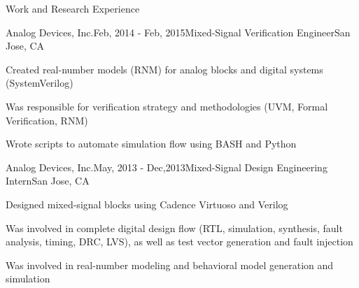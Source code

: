 \begin{rSection} {Work and Research Experience}
\begin{rSubsection}{Analog Devices, Inc.}{Feb, 2014 - Feb, 2015}{Mixed-Signal Verification Engineer}{San Jose, CA}
  \item Created real-number models (RNM) for analog blocks and digital systems (SystemVerilog)
  \item Was responsible for verification strategy and methodologies (UVM, Formal Verification, RNM)
  \item Wrote scripts to automate simulation flow using BASH and Python
  \end{rSubsection}
  \begin{rSubsection}{Analog Devices, Inc.}{May, 2013 - Dec,2013}{Mixed-Signal Design Engineering Intern}{San Jose, CA}
  \item Designed mixed-signal blocks using Cadence Virtuoso and Verilog
  \item Was involved in complete digital design flow (RTL, simulation, synthesis, fault analysis, timing, DRC, LVS), as well as test vector generation and fault injection
  \item Was involved in real-number modeling and behavioral model generation and simulation
  \end{rSubsection}
\end{rSection}
